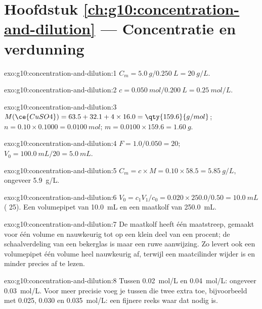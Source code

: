 \section*{Hoofdstuk \ref{ch:g10:concentration-and-dilution} --- Concentratie en verdunning}

\begin{solution}{exo:g10:concentration-and-dilution:1}
$C_m = \qty{5.0}{g} / \qty{0.250}{L} = \qty{20}{g/L}$.
\end{solution}

\begin{solution}{exo:g10:concentration-and-dilution:2}
$c = \qty{0.050}{mol} / \qty{0.200}{L} = \qty{0.25}{mol/L}$.
\end{solution}

\begin{solution}{exo:g10:concentration-and-dilution:3}
$M(\ce{CuSO4}) = 63.5 + 32.1 + 4 \times 16.0 = \qty{159.6}{g/mol}$;
$n = 0.10 \times 0.1000 = \qty{0.0100}{mol}$; $m = 0.0100 \times 159.6 =
\qty{1.60}{g}$.
\end{solution}

\begin{solution}{exo:g10:concentration-and-dilution:4}
$F = 1.0 / 0.050 = 20$; $V_0 = \qty{100.0}{mL} / 20 = \qty{5.0}{mL}$.
\end{solution}

\begin{solution}{exo:g10:concentration-and-dilution:5}
$C_m = c \times M = 0.10 \times 58.5 = \qty{5.85}{g/L}$, ongeveer
\qty{5.9}{g/L}.
\end{solution}

\begin{solution}{exo:g10:concentration-and-dilution:6}
$V_0 = c_1 V_1 / c_0 = 0.020 \times 250.0 / 0.50 = \qty{10.0}{mL}$
( 25). Een volumepipet van \qty{10.0}{mL} en een
maatkolf van \qty{250.0}{mL}.
\end{solution}

\begin{solution}{exo:g10:concentration-and-dilution:7}
De maatkolf heeft één maatstreep, gemaakt voor één volume en nauwkeurig
tot op een klein deel van een procent; de schaalverdeling van een
bekerglas is maar een ruwe aanwijzing. Zo levert ook een volumepipet één
volume heel nauwkeurig af, terwijl een maatcilinder wijder is en minder
precies af te lezen.
\end{solution}

\begin{solution}{exo:g10:concentration-and-dilution:8}
Tussen \qty{0.02}{mol/L} en \qty{0.04}{mol/L}: ongeveer \qty{0.03}{mol/L}.
Voor meer precisie voeg je tussen die twee extra 
toe, bijvoorbeeld met 0.025, 0.030 en \qty{0.035}{mol/L}: een fijnere
reeks waar dat nodig is.
\end{solution}


